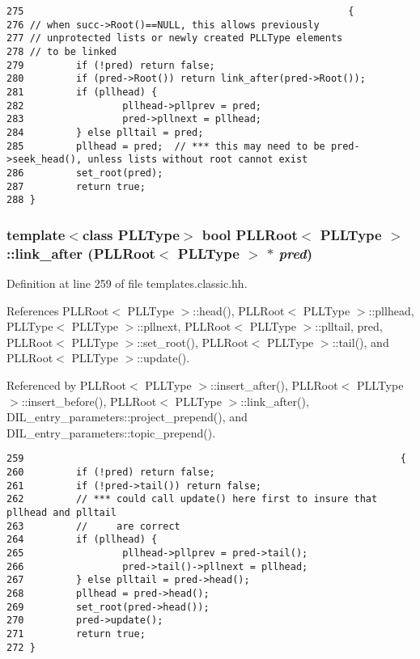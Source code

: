 \footnotesize\begin{verbatim}275                                                        { 
276 // when succ->Root()==NULL, this allows previously
277 // unprotected lists or newly created PLLType elements
278 // to be linked
279         if (!pred) return false; 
280         if (pred->Root()) return link_after(pred->Root()); 
281         if (pllhead) { 
282                 pllhead->pllprev = pred; 
283                 pred->pllnext = pllhead; 
284         } else plltail = pred; 
285         pllhead = pred;  // *** this may need to be pred->seek_head(), unless lists without root cannot exist
286         set_root(pred); 
287         return true; 
288 }
\end{verbatim}\normalsize 
{}
\subsubsection{\setlength{\rightskip}{0pt plus 5cm}template$<$class PLLType$>$ bool PLLRoot$<$ {\bf PLLType} $>$::link\_\-after (PLLRoot$<$ {\bf PLLType} $>$ $\ast$ {\em pred})\hspace{0.3cm}{\tt  [inline]}}\label{classPLLRoot_a10}




Definition at line 259 of file templates.classic.hh.

References PLLRoot$<$ PLLType $>$::head(), PLLRoot$<$ PLLType $>$::pllhead, PLLType$<$ PLLType $>$::pllnext, PLLRoot$<$ PLLType $>$::plltail, pred, PLLRoot$<$ PLLType $>$::set\_\-root(), PLLRoot$<$ PLLType $>$::tail(), and PLLRoot$<$ PLLType $>$::update().

Referenced by PLLRoot$<$ PLLType $>$::insert\_\-after(), PLLRoot$<$ PLLType $>$::insert\_\-before(), PLLRoot$<$ PLLType $>$::link\_\-after(), DIL\_\-entry\_\-parameters::project\_\-prepend(), and DIL\_\-entry\_\-parameters::topic\_\-prepend().



\footnotesize\begin{verbatim}259                                                                 { 
260         if (!pred) return false; 
261         if (!pred->tail()) return false; 
262         // *** could call update() here first to insure that pllhead and plltail
263         //     are correct
264         if (pllhead) { 
265                 pllhead->pllprev = pred->tail(); 
266                 pred->tail()->pllnext = pllhead; 
267         } else plltail = pred->head(); 
268         pllhead = pred->head(); 
269         set_root(pred->head()); 
270         pred->update(); 
271         return true; 
272 }
\end{verbatim}\normalsize 
{}
